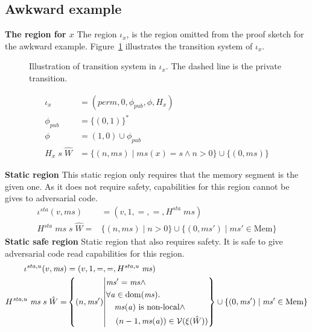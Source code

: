 \documentclass[format=acmsmall, review=true, screen=true]{acmart}
\renewcommand{\figurename}{Figure}
\newcommand{\union}{\mathbin{\cup}}
\DeclareMathOperator{\dom}{dom}
\newcommand{\var}[1]{\mathit{#1}}
\newcommand{\hs}{\var{ms}}
\newcommand{\ms}{\hs}
\newcommand{\addr}{\var{a}}
\newcommand{\perm}{\var{perm}}
\newcommand{\sta}{\var{sta}}
\newcommand{\pub}{\var{pub}}
\newcommand{\asmType}{\plaindom{AsmType}}
\newcommand{\plaindom}[1]{\mathrm{#1}}
\newcommand{\Heaps}{\plaindom{Mem}}
\newcommand{\Mems}{\Heaps}
\newcommand{\intr}[2]{\mathcal{#1}}
\newcommand{\valueintr}[1]{\intr{V}{#1}}
\newcommand{\stdvr}{\valueintr{\asmType}}
\newcommand{\npair}[2][n]{\left(#1,#2 \right)}
\newcommand{\nonlocal}[1]{\ensuremath{#1} \text{ is non-local}}
\begin{document}
\subsection{Awkward example}
\textbf{The region for $x$} The region $\iota_x$, is the region omitted from the proof sketch for the awkward example.
\figurename~\ref{fig:x-reg} illustrates the transition system of $\iota_x$.
  \begin{figure}[tb]
    \centering
{}
  \caption{Illustration of transition system in $\iota_x$. The dashed line is
    the private transition.}
  \label{fig:x-reg}
\end{figure}

\begin{definition}
  \label{def:iotax-region}
  \begin{align*}
    \iota_x   & = (\perm, 0, \phi_\pub, \phi, H_x) \\
    \phi_\pub & = \{(0,1)\}^* \\
    \phi      & = (1,0) \union \phi_\pub \\
    H_x \; s \; \hat{W} & = \{\npair{\ms} \mid \ms(x) = s \land n > 0 \} \union \{\npair[0]{\ms}\}
  \end{align*}
\end{definition}
\textbf{Static region} This static region only requires that the memory segment is the given one.
As it does not require safety, capabilities for this region cannot be gives to adversarial code.
\begin{align*}
  \iota^\sta (v,\ms) &= (v,1,=,=,H^\sta\;\ms)\\
  H^\sta \; \ms \; s \; \hat{W} = & \{\npair{\ms} \mid n > 0 \} \union \{\npair[0]{\ms'} \mid \ms' \in \Mems \}
\end{align*}
\textbf{Static safe region} Static region that also requires safety.
It is safe to give adversarial code read capabilities for this region.
\begin{align*}
  \iota^{\sta,u} (v,\ms) &= (v,1,=,=,H^{\sta,u}\;\ms)\\
  H^{\sta,u} \; \ms \; s \; \hat{W} = & \left\{\npair{\ms'} \middle|
    \begin{aligned}
      &\ms' = \ms \land\\
      &\forall \addr \in \dom(\ms) \ldotp\\
      & \quad \nonlocal{\ms(\addr)} \land\\
      & \quad \npair[n-1]{\ms(\addr)} \in \stdvr(\xi(\hat{W}))
    \end{aligned}
        \right\} \union \{\npair[0]{\ms'} \mid \ms' \in \Mems \}
\end{align*}
\end{document}
